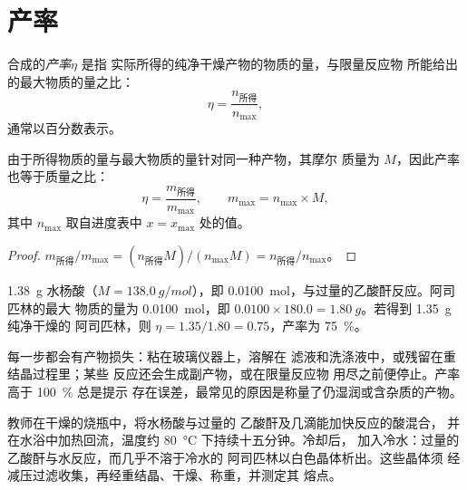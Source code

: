 \section{产率}

\begin{definition}[产率]\label{def:g10:synthesis-yield:yield}
合成的\emph{产率}$\eta$ 是指
实际所得的纯净干燥产物的物质的量，与限量反应物
所能给出的最大物质的量之比：
\[
  \eta = \frac{n_{\text{所得}}}{n_{\max}} ,
\]
通常以百分数表示。
\end{definition}

\begin{proposition}[由质量求产率]\label{prop:g10:synthesis-yield:masses}
由于所得物质的量与最大物质的量针对同一种产物，其摩尔
质量为 $M$，因此产率也等于质量之比：
\[
  \eta = \frac{m_{\text{所得}}}{m_{\max}},
  \qquad m_{\max} = n_{\max} \times M,
\]
其中 $n_{\max}$ 取自进度表中 $x = x_{\max}$ 处的值。
\end{proposition}

\begin{proof}
$m_{\text{所得}} / m_{\max} = (n_{\text{所得}} M) / (n_{\max} M)
= n_{\text{所得}} / n_{\max}$。
\end{proof}

\begin{example}[小规模合成的产率]\label{ex:g10:synthesis-yield:small}
\qty{1.38}{g} 水杨酸（$M = \qty{138.0}{g/mol}$），即
\qty{0.0100}{mol}，与过量的乙酸酐反应。阿司匹林的最大
物质的量为 \qty{0.0100}{mol}，即
$0.0100 \times 180.0 = \qty{1.80}{g}$。若得到 \qty{1.35}{g} 纯净干燥的
阿司匹林，则 $\eta = 1.35 / 1.80 = 0.75$，产率为
\qty{75}{\percent}。
\end{example}

\begin{remark}[产率为何低于 100 \%]\label{rem:g10:synthesis-yield:below}
每一步都会有产物损失：粘在玻璃仪器上，溶解在
滤液和洗涤液中，或残留在重结晶过程里；某些
反应还会生成副产物，或在限量反应物
用尽之前便停止。产率高于 \qty{100}{\percent} 总是提示
存在误差，最常见的原因是称量了仍湿润或含杂质的产物。
\end{remark}

\begin{inthelab}[制备阿司匹林]
教师在干燥的烧瓶中，将水杨酸与过量的
乙酸酐及几滴能加快反应的酸混合，
并在水浴中加热回流，温度约
\qty{80}{\celsius} 下持续十五分钟。冷却后，
加入冷水：过量的乙酸酐与水反应，而几乎不溶于冷水的
阿司匹林以白色晶体析出。这些晶体须
经减压过滤收集，再经重结晶、干燥、称重，并测定其
熔点。
\end{inthelab}

